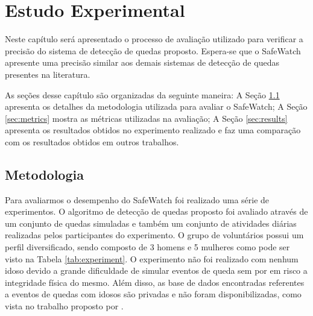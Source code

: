 \chapter{Estudo Experimental}
\label{cap:avaliacao}

Neste capítulo será apresentado o processo de avaliação utilizado para verificar a precisão do sistema de detecção de quedas proposto. Espera-se que o SafeWatch apresente uma precisão similar aos demais sistemas de detecção de quedas presentes na literatura.

As seções desse capítulo são organizadas da seguinte maneira: A Seção \ref{sec:metodology} apresenta os detalhes da metodologia utilizada para avaliar o SafeWatch; A Seção \ref{sec:metrics} mostra as métricas utilizadas na avaliação; A Seção \ref{sec:results} apresenta os resultados obtidos no experimento realizado e faz uma comparação com os resultados obtidos em outros trabalhos.



\section{Metodologia}
\label{sec:metodology}

Para avaliarmos o desempenho do SafeWatch foi realizado uma série de experimentos. O algoritmo de detecção de quedas proposto foi avaliado através de um conjunto de quedas simuladas e também um conjunto de atividades diárias realizadas pelos participantes do experimento. O grupo de voluntários possui um perfil diversificado, sendo composto de 3 homens e 5 mulheres como pode ser visto na Tabela \ref{tab:experiment}. O experimento não foi realizado com nenhum idoso devido a grande dificuldade de simular eventos de queda sem por em risco a integridade física do mesmo. Além disso, as base de dados encontradas referentes a eventos de quedas com idosos são privadas e não foram disponibilizadas, como vista no trabalho proposto por \cite{kostopoulos2015f2d}.


